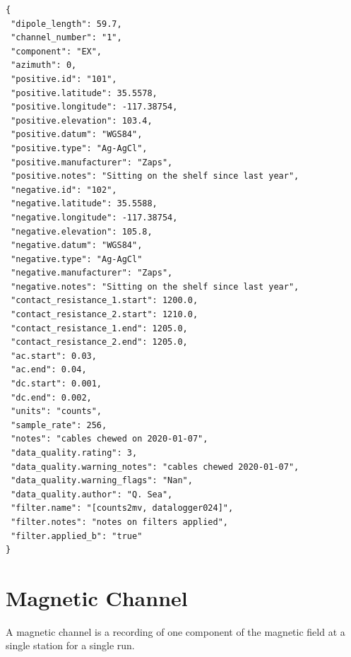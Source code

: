 \documentclass{article}
\begin{document}
\begin{verbatim}
{
 "dipole_length": 59.7,
 "channel_number": "1",
 "component": "EX",
 "azimuth": 0,
 "positive.id": "101",
 "positive.latitude": 35.5578,
 "positive.longitude": -117.38754,
 "positive.elevation": 103.4,
 "positive.datum": "WGS84",
 "positive.type": "Ag-AgCl",
 "positive.manufacturer": "Zaps",
 "positive.notes": "Sitting on the shelf since last year",
 "negative.id": "102",
 "negative.latitude": 35.5588,
 "negative.longitude": -117.38754,
 "negative.elevation": 105.8,
 "negative.datum": "WGS84",
 "negative.type": "Ag-AgCl"
 "negative.manufacturer": "Zaps",
 "negative.notes": "Sitting on the shelf since last year",
 "contact_resistance_1.start": 1200.0,
 "contact_resistance_2.start": 1210.0,
 "contact_resistance_1.end": 1205.0,
 "contact_resistance_2.end": 1205.0,
 "ac.start": 0.03,
 "ac.end": 0.04,
 "dc.start": 0.001,
 "dc.end": 0.002,
 "units": "counts",
 "sample_rate": 256,
 "notes": "cables chewed on 2020-01-07",
 "data_quality.rating": 3,
 "data_quality.warning_notes": "cables chewed 2020-01-07",
 "data_quality.warning_flags": "Nan",
 "data_quality.author": "Q. Sea",
 "filter.name": "[counts2mv, datalogger024]",
 "filter.notes": "notes on filters applied",
 "filter.applied_b": "true"
}
\end{verbatim}

\newpage
\section{Magnetic Channel}

A magnetic channel is a recording of one component of the magnetic field at a single station for a single run.
\end{document}
